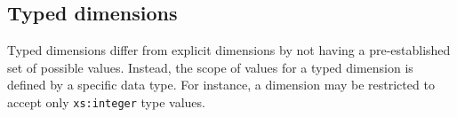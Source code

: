 





\subsection{Typed dimensions}

Typed dimensions differ from explicit dimensions by not having a pre-established set of possible values.
Instead, the scope of values for a typed dimension is defined by a specific data type.
For instance, a dimension may be restricted to accept only \texttt{xs:integer} type values.

